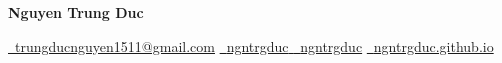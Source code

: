 \documentclass[letterpaper,11pt]{article}
\begin{document}
\begin{center}
    {\Huge \textbf{Nguyen Trung Duc}} \\
    \vspace{0.7em}

    \href{mailto:trungducnguyen1511@gmail.com}{\faEnvelope\ {trungducnguyen1511@gmail.com}} \quad 
    \href{https://www.linkedin.com/in/ngntrgduc/}{\faLinkedin\ {ngntrgduc}
    } \quad
    \href{https://github.com/ngntrgduc}{\faGithub\ {ngntrgduc}} \quad
    \href{https://ngntrgduc.github.io/}{\faHome\ {ngntrgduc.github.io}} 
\end{center}


\begin{comment}
\vspace{0.4em}

Highly motivated final-year undergraduate in Mathematics and Computer Science with a strong interest~in Probability and Statistics, Data Science, Statistical Learning, and Quantitative Finance. 
Seeking graduate study in Probability and Statistics or Applied Mathematics to further develop expertise in these~areas.
\end{comment}
\end{document}
